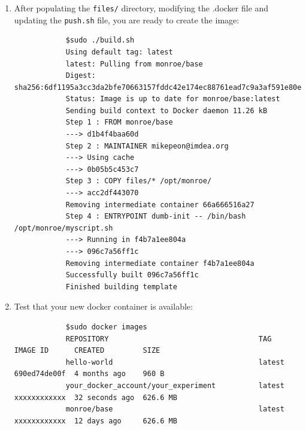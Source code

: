 \documentclass[a4paper,10pt]{article}
\newcommand{\tabitem}{~~\llap{\textbullet}~~}
\newcommand{\VerbatimFont}{\footnotesize}
\newcommand{\monroe}{MONROE}
\newcommand{\identifier}[1]{{\texttt{\small{#1}}}}
\begin{document}
\begin{enumerate}
{\begin{verbatim}
			docker login && docker tag ${CONTAINER} ${CONTAINERTAG} && docker push ${CONTAINERTAG} && \
			    echo "Finished uploading ${CONTAINERTAG}"					
		\end{verbatim}}
		During the development phase of your experiment, follow these steps to make your container accessible for the testing nodes:
		\begin{itemize}
			\item Create an account at Docker Hub.
			\item Create your own repository (you can create one container as private; no limits for public ones). Containers for deployment on \monroe{} nodes must be public.
			\item In your development machine, run: \identifier{docker login}. It will ask you for your credentials.  \tabitem
		\end{itemize}
	\item After populating the \identifier{files/} directory, modifying the .docker file and updating the \identifier{push.sh} file, you are ready to create the image:
		{\VerbatimFont\begin{verbatim}
			$sudo ./build.sh
			Using default tag: latest
			latest: Pulling from monroe/base
			Digest: sha256:6df1195a3cc3da2bfe70663157fddc42e174ec88761ead7c9a3af591e80ebbd5
			Status: Image is up to date for monroe/base:latest
			Sending build context to Docker daemon 11.26 kB
			Step 1 : FROM monroe/base
			---> d1b4f4baa60d
			Step 2 : MAINTAINER mikepeon@imdea.org
			---> Using cache
			---> 0b05b5c453c7
			Step 3 : COPY files/* /opt/monroe/
			---> acc2df443070
			Removing intermediate container 66a666516a27
			Step 4 : ENTRYPOINT dumb-init -- /bin/bash /opt/monroe/myscript.sh
			---> Running in f4b7a1ee804a
			---> 096c7a56ff1c
			Removing intermediate container f4b7a1ee804a
			Successfully built 096c7a56ff1c
			Finished building template
		\end{verbatim}}
	\item Test that your new docker container is available:
		{\VerbatimFont\begin{verbatim}
			$sudo docker images
			REPOSITORY                                   TAG    IMAGE ID      CREATED         SIZE
			hello-world                                  latest 690ed74de00f  4 months ago    960 B
			your_docker_account/your_experiment          latest xxxxxxxxxxxx  32 seconds ago  626.6 MB
			monroe/base                                  latest xxxxxxxxxxxx  12 days ago     626.6 MB
		\end{verbatim}}

\end{enumerate}
\end{document}
